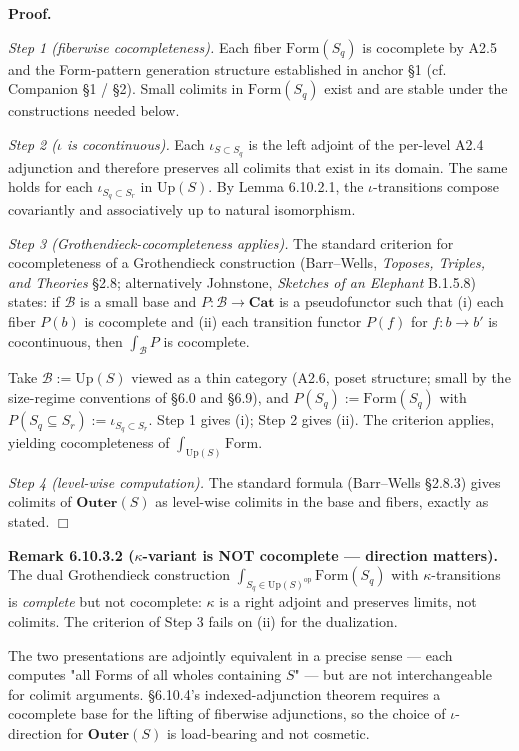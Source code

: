 \documentclass[11pt, openany]{book}
\begin{document}
\textbf{Proof.}

\textit{Step 1 (fiberwise cocompleteness).} Each fiber $\mathrm{Form}(S_q)$ is cocomplete by A2.5 and the Form-pattern generation structure established in anchor §1 (cf. Companion §1 / §2). Small colimits in $\mathrm{Form}(S_q)$ exist and are stable under the constructions needed below.

\textit{Step 2 ($\iota$ is cocontinuous).} Each $\iota_{S \subset S_q}$ is the left adjoint of the per-level A2.4 adjunction and therefore preserves all colimits that exist in its domain. The same holds for each $\iota_{S_q \subset S_r}$ in $\mathrm{Up}(S)$. By Lemma 6.10.2.1, the $\iota$-transitions compose covariantly and associatively up to natural isomorphism.

\textit{Step 3 (Grothendieck-cocompleteness applies).} The standard criterion for cocompleteness of a Grothendieck construction (Barr–Wells, \textit{Toposes, Triples, and Theories} §2.8; alternatively Johnstone, \textit{Sketches of an Elephant} B.1.5.8) states: if $\mathcal{B}$ is a small base and $P : \mathcal{B} \to \mathbf{Cat}$ is a pseudofunctor such that (i) each fiber $P(b)$ is cocomplete and (ii) each transition functor $P(f)$ for $f : b \to b'$ is cocontinuous, then $\int_{\mathcal{B}} P$ is cocomplete.

Take $\mathcal{B} := \mathrm{Up}(S)$ viewed as a thin category (A2.6, poset structure; small by the size-regime conventions of §6.0 and §6.9), and $P(S_q) := \mathrm{Form}(S_q)$ with $P(S_q \subseteq S_r) := \iota_{S_q \subset S_r}$. Step 1 gives (i); Step 2 gives (ii). The criterion applies, yielding cocompleteness of $\int_{\mathrm{Up}(S)} \mathrm{Form}$.

\textit{Step 4 (level-wise computation).} The standard formula (Barr–Wells §2.8.3) gives colimits of $\mathbf{Outer}(S)$ as level-wise colimits in the base and fibers, exactly as stated. $\Box$

\textbf{Remark 6.10.3.2 ($\kappa$-variant is NOT cocomplete --- direction matters).} The dual Grothendieck construction $\int_{S_q \in \mathrm{Up}(S)^{\mathrm{op}}} \mathrm{Form}(S_q)$ with $\kappa$-transitions is \textit{complete} but not cocomplete: $\kappa$ is a right adjoint and preserves limits, not colimits. The criterion of Step 3 fails on (ii) for the dualization.

The two presentations are adjointly equivalent in a precise sense --- each computes "all Forms of all wholes containing $S$" --- but are not interchangeable for colimit arguments. §6.10.4's indexed-adjunction theorem requires a cocomplete base for the lifting of fiberwise adjunctions, so the choice of $\iota$-direction for $\mathbf{Outer}(S)$ is load-bearing and not cosmetic.
\end{document}
